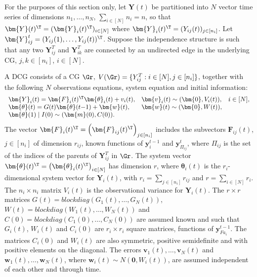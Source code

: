 For the purposes of this section only, let $\bm{Y}(t)$ be partitioned into $N$ vector time series of dimensions $n_1,\dots,n_N$, $\sum_{i\in[N]}n_i=n$, so that $\bm{Y}(t)^\T=(\bm{Y}_i(t)^\T)_{i\in[N]}$ where $\bm{Y}_i(t)^\T=(Y_{ij}(t))_{j\in[n_i]}$. Let $\bm{Y}_{ij}^t=(Y_{ij}(1),\dots,Y_{ij}(t))^\T$. Suppose the independence structure is such that any two $\bm{Y}_{ij}^T$ and $\bm{Y}_{ik}^T$ are connected by an undirected edge in the underlying \gls{CG}, $j,k\in [n_i]$, $i\in [N]$. 

\begin{definition}
A \gls{DCG} consists of a \gls{CG} $\Gr$, $V(\Gr)=\{Y_{ij}^T:i\in[N],j\in[n_i]\}$, together with the following $N$ observations equations, system equation and initial information:
\begin{equation*}
\begin{array}{lll}
\bm{Y}_i(t)=\bm{F}_i(t)^\T\bm{\theta}_i(t)+v_i(t),&\bm{v}_i(t)\sim(\bm{0},V_i(t)), &i\in [N],\\
\bm{\theta}(t)=G(t)\bm{\theta}(t{-1})+\bm{w}(t), & \bm{w}(t)\sim(\bm{0},W(t)),&\\
\bm{\theta}(1)\;|\;I(0)\sim (\bm{m}(0),C(0)).
\end{array}
\end{equation*}
The vector $\bm{F}_i(t)^\T=\left(\bm{F}_{ij}(t)^\T\right)_{j\in[n_i]}$ includes the subvectors $\bm{F}_{ij}(t)$, $j\in[n_i]$ of dimension $r_{ij}$, known functions of $\bm{y}^{t-1}_i$ and $\bm{y}^t_{\Pi_{ij}}$, where $\Pi_{ij}$ is the set of the indices of the parents of $\bm{Y}_{ij}^T$ in $\Gr$. The system vector $\bm{\theta}(t)^\T=\left(\bm{\theta}_i(t)^\T\right)_{i\in[N]}$ has dimension $r$, where $\bm{\theta}_i(t)$ is the $r_i$-dimensional system vector for $\bm{Y}_i(t)$, with $r_i=\sum_{j\in[n_i]}r_{ij}$ and $r=\sum_{i\in[N]}r_i$. The $n_i\times n_i$ matrix $V_i(t)$ is the observational variance for $\bm{Y}_i(t)$. The $r\times r$ matrices $G(t)=blockdiag(G_1(t),\dots,G_N(t))$, $W(t)=blockdiag(W_1(t),\dots,W_N(t))$ and $C(0)=blockdiag(C_1(0),\dots,C_N(0))$ are assumed known and such that $G_i(t)$, $W_i(t)$ and $C_i(0)$ are $r_i\times r_i$ square matrices, functions of $\bm{y}^{t-1}_{Fa_i}$. The matrices $C_i(0)$ and $W_i(t)$ are also symmetric, positive semidefinite and with positive elements on the diagonal. The errors $\bm{v}_1(t),\dots, \bm{v}_N(t)$ and $\bm{w}_1(t),\dots,\bm{w}_N(t)$, where $\bm{w}_i(t)\sim N(\bm{0},W_i(t))$, are assumed independent of each other and through time. 
\end{definition}


